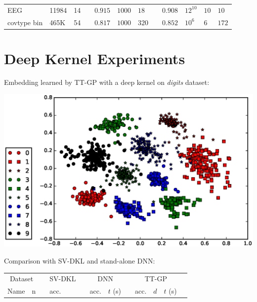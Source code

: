 \documentclass[a0,portrait]{a0poster}
\begin{document}
\begin{multicols}{2}
\begin{center}
\begin{tabular}{lll l cll l clll}
    EEG & 11984 & 14 &&
    $\mathbf{0.915}$ & $1000$ & $18$ &&
    $0.908$ & $12^{10}$ & $10$ & $10$\\

    covtype bin & 465K & 54 &&
    $0.817$ & $1000$ & $320$ &&
    $\mathbf{0.852}$ & $10^6$ & $6$ & $172$\\
    \bottomrule
  \end{tabular}
\end{center}
\section*{\LARGE \color{NavyBlue} Deep Kernel Experiments}
    
Embedding learned by TT-GP with a deep kernel on {\it digits}
dataset:

\begin{center}
    \includegraphics[width=20cm]{pics/embed/embedding_2.eps}
\end{center}

Comparison with SV-DKL \citep{wilson2016stochastic} and stand-alone
DNN:

\begin{center}
    \label{deep_results}
    \centering
    \begin{tabular}{lll ll llll lll}
      \toprule
      \multicolumn{2}{c}{Dataset}  && SV-DKL &&
      \multicolumn{2}{c}{DNN} &&
      \multicolumn{3}{c}{TT-GP}\\

      \cmidrule{1-2}
      \cmidrule{4-4}
      \cmidrule{6-7}
      \cmidrule{9-11}

      Name & n &&
      acc. && acc. & $t$ (s) &&
      acc. & $d$ & $t$ (s)
      \\
      \midrule



\end{tabular}
\end{center}
\end{multicols}
\end{document}
